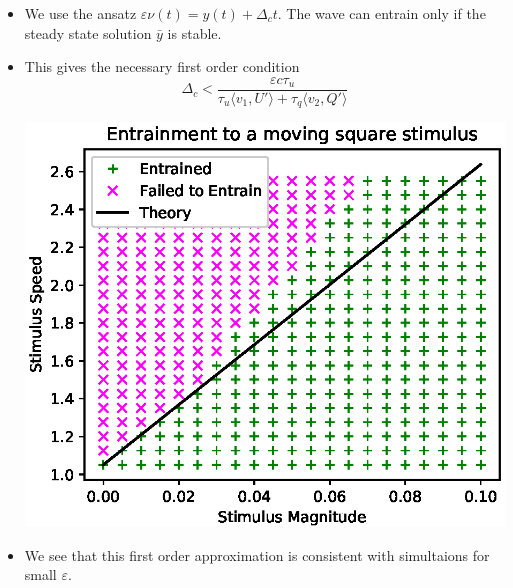 \documentclass[landscape,final]{baposter}
\begin{document}
\begin{poster}
{\begin{itemize}
		\item We use the ansatz $\varepsilon \nu(t) = y(t) + \Delta_c t$. The wave can entrain only if the steady state solution $\bar{y}$ is stable.
		\item This gives the necessary first order condition
		$$
			\Delta_c < \frac{\varepsilon c \tau_u}{\tau_u \langle v_1, U' \rangle + \tau_q \langle v_2, Q' \rangle}
		$$
		\vspace{-.5cm}
		\begin{center}
			\includegraphics[width=.9\linewidth, trim={0cm, .0cm, 0cm, 0.4cm}, clip=true]{entrainment_square_contour}
		\end{center}
		\item We see that this first order approximation is consistent with simultaions for small $\varepsilon$.
	\end{itemize}
}


\end{poster}
\end{document}

